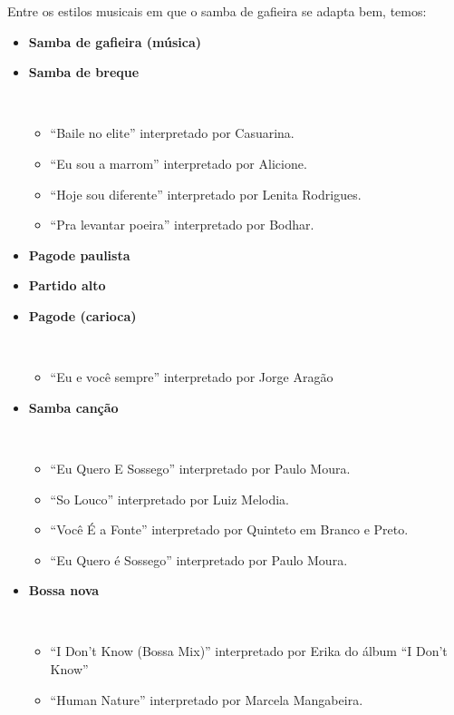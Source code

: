 Entre os estilos musicais em que o samba de gafieira se adapta bem, temos:
\begin{itemize}
\item \textbf{Samba de gafieira (música)}

\item \textbf{Samba de breque}
\begin{example} ~
\begin{itemize}
\item ``Baile no elite'' interpretado por Casuarina.
\item ``Eu sou a marrom'' interpretado por Alicione.
\item ``Hoje sou diferente'' interpretado por Lenita Rodrigues.
\item ``Pra levantar poeira'' interpretado por Bodhar.
\end{itemize}
\end{example} 

\item \textbf{Pagode paulista}

\item \textbf{Partido alto}


\item \textbf{Pagode (carioca)}
\begin{example} ~
\begin{itemize}
\item ``Eu e você sempre'' interpretado por Jorge Aragão
\end{itemize}
\end{example} 

\item \textbf{Samba canção}
\begin{example} ~
\begin{itemize}
\item ``Eu Quero E Sossego'' interpretado por Paulo Moura.
\item ``So Louco'' interpretado por Luiz Melodia.
\item ``Você É a Fonte'' interpretado por  Quinteto em Branco e Preto.
\item ``Eu Quero é Sossego'' interpretado por Paulo Moura.
\end{itemize}
\end{example} 

\item \textbf{Bossa nova}
\begin{example} ~
\begin{itemize}
\item ``I Don't Know (Bossa Mix)'' interpretado por Erika do álbum ``I Don't Know''
\item ``Human Nature'' interpretado por Marcela Mangabeira.
\end{itemize}
\end{example} 



\end{itemize}
